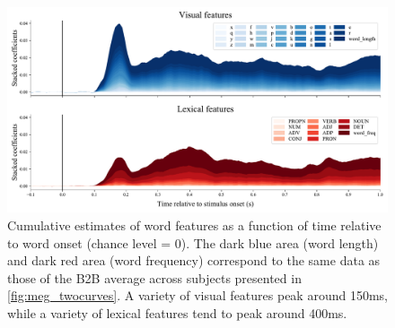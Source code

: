 \begin{figure}
  \centering
  \includegraphics[width=\textwidth, trim=0cm 0cm 0cm 0cm, clip=True]{figures/meg_result.pdf}
  \caption{Cumulative estimates of word features as a function of time relative to word onset (chance level = 0). The dark blue area (word length) and dark red area (word frequency) correspond to the same data as those of the B2B average across subjects presented in \ref{fig:meg_twocurves}. A variety of visual features peak around 150ms, while a variety of lexical features tend to peak around 400ms.}
  \label{fig:megresult}
\end{figure}
